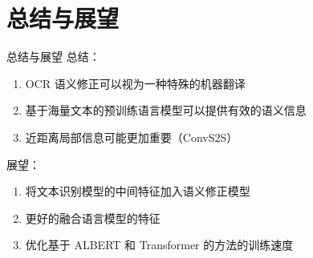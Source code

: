 \section{总结与展望}

\begin{frame}[c]{总结与展望}
	总结：
	\begin{enumerate}
		\item OCR 语义修正可以视为一种特殊的机器翻译
		\item 基于海量文本的预训练语言模型可以提供有效的语义信息
		\item 近距离局部信息可能更加重要（ConvS2S）
	\end{enumerate}
	展望：
	\begin{enumerate}
		\item 将文本识别模型的中间特征加入语义修正模型
		\item 更好的融合语言模型的特征
		\item 优化基于 ALBERT 和 Transformer 的方法的训练速度
	\end{enumerate}
\end{frame}

\begin{frame}[c]{}
	\begin{center}
		\begin{spacing}{2}
			{\LARGE {} \\ }
		\end{spacing}
	\end{center}
\end{frame}